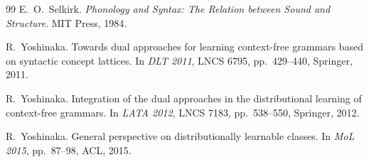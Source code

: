 \documentclass[11pt]{article}
\numberwithin{equation}{section}
\theoremstyle{plain}
\theoremstyle{definition}
\theoremstyle{remark}
\theoremstyle{plain}
\begin{document}
\begin{thebibliography}{99}
E.~O.~Selkirk.
\textit{Phonology and Syntax: The Relation between Sound and Structure}.
MIT Press, 1984.

R.~Yoshinaka.
Towards dual approaches for learning context-free grammars based on
syntactic concept lattices.
In \textit{DLT 2011}, LNCS 6795, pp.~429--440, Springer, 2011.

R.~Yoshinaka.
Integration of the dual approaches in the distributional learning of
context-free grammars.
In \textit{LATA 2012}, LNCS 7183, pp.~538--550, Springer, 2012.

R.~Yoshinaka.
General perspective on distributionally learnable classes.
In \textit{MoL 2015}, pp.~87--98, ACL, 2015.

\end{thebibliography}
\end{document}
